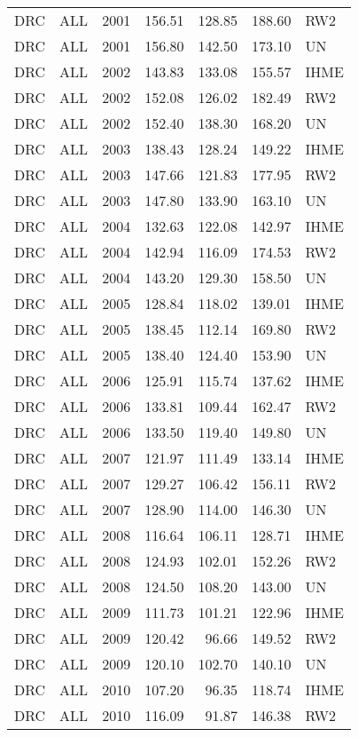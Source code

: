 \begin{longtable}{lllrrrl}
  DRC & ALL & 2001 & 156.51 & 128.85 & 188.60 & RW2 \\ 
  DRC & ALL & 2001 & 156.80 & 142.50 & 173.10 & UN \\ 
  DRC & ALL & 2002 & 143.83 & 133.08 & 155.57 & IHME \\ 
  DRC & ALL & 2002 & 152.08 & 126.02 & 182.49 & RW2 \\ 
  DRC & ALL & 2002 & 152.40 & 138.30 & 168.20 & UN \\ 
  DRC & ALL & 2003 & 138.43 & 128.24 & 149.22 & IHME \\ 
  DRC & ALL & 2003 & 147.66 & 121.83 & 177.95 & RW2 \\ 
  DRC & ALL & 2003 & 147.80 & 133.90 & 163.10 & UN \\ 
  DRC & ALL & 2004 & 132.63 & 122.08 & 142.97 & IHME \\ 
  DRC & ALL & 2004 & 142.94 & 116.09 & 174.53 & RW2 \\ 
  DRC & ALL & 2004 & 143.20 & 129.30 & 158.50 & UN \\ 
  DRC & ALL & 2005 & 128.84 & 118.02 & 139.01 & IHME \\ 
  DRC & ALL & 2005 & 138.45 & 112.14 & 169.80 & RW2 \\ 
  DRC & ALL & 2005 & 138.40 & 124.40 & 153.90 & UN \\ 
  DRC & ALL & 2006 & 125.91 & 115.74 & 137.62 & IHME \\ 
  DRC & ALL & 2006 & 133.81 & 109.44 & 162.47 & RW2 \\ 
  DRC & ALL & 2006 & 133.50 & 119.40 & 149.80 & UN \\ 
  DRC & ALL & 2007 & 121.97 & 111.49 & 133.14 & IHME \\ 
  DRC & ALL & 2007 & 129.27 & 106.42 & 156.11 & RW2 \\ 
  DRC & ALL & 2007 & 128.90 & 114.00 & 146.30 & UN \\ 
  DRC & ALL & 2008 & 116.64 & 106.11 & 128.71 & IHME \\ 
  DRC & ALL & 2008 & 124.93 & 102.01 & 152.26 & RW2 \\ 
  DRC & ALL & 2008 & 124.50 & 108.20 & 143.00 & UN \\ 
  DRC & ALL & 2009 & 111.73 & 101.21 & 122.96 & IHME \\ 
  DRC & ALL & 2009 & 120.42 & 96.66 & 149.52 & RW2 \\ 
  DRC & ALL & 2009 & 120.10 & 102.70 & 140.10 & UN \\ 
  DRC & ALL & 2010 & 107.20 & 96.35 & 118.74 & IHME \\ 
  DRC & ALL & 2010 & 116.09 & 91.87 & 146.38 & RW2 \\ 

\end{longtable}
